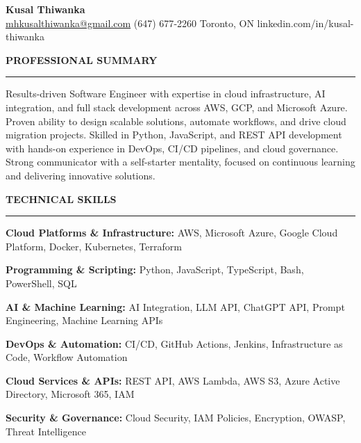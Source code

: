 \documentclass[10pt,letterpaper]{article}
\begin{document}
\begin{center}
{\LARGE\textbf{Kusal Thiwanka}}\\[3pt]
\href{mailto:mhkusalthiwanka@gmail.com}{mhkusalthiwanka@gmail.com}\hspace{2em}%
(647) 677{-}2260\hspace{2em}%
Toronto, ON\hspace{2em}
linkedin.com/in/kusal-thiwanka
\end{center}

\vspace{6pt}

\textbf{PROFESSIONAL SUMMARY}\\[-8pt]
\noindent\rule{\textwidth}{1pt}

\vspace{-2pt}

Results-driven Software Engineer with expertise in cloud infrastructure, AI integration, and full stack development across AWS, GCP, and Microsoft Azure. Proven ability to design scalable solutions, automate workflows, and drive cloud migration projects. Skilled in Python, JavaScript, and REST API development with hands-on experience in DevOps, CI/CD pipelines, and cloud governance. Strong communicator with a self-starter mentality, focused on continuous learning and delivering innovative solutions.

\vspace{8pt}

\textbf{TECHNICAL SKILLS}\\[-8pt]
\noindent\rule{\textwidth}{1pt}

\vspace{-2pt}

\textbf{Cloud Platforms \& Infrastructure:} AWS, Microsoft Azure, Google Cloud Platform, Docker, Kubernetes, Terraform

\textbf{Programming \& Scripting:} Python, JavaScript, TypeScript, Bash, PowerShell, SQL

\textbf{AI \& Machine Learning:} AI Integration, LLM API, ChatGPT API, Prompt Engineering, Machine Learning APIs

\textbf{DevOps \& Automation:} CI/CD, GitHub Actions, Jenkins, Infrastructure as Code, Workflow Automation

\textbf{Cloud Services \& APIs:} REST API, AWS Lambda, AWS S3, Azure Active Directory, Microsoft 365, IAM

\textbf{Security \& Governance:} Cloud Security, IAM Policies, Encryption, OWASP, Threat Intelligence
\end{document}
